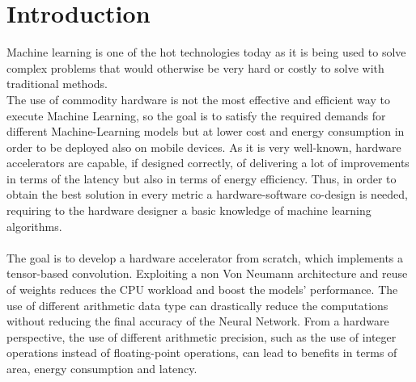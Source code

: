 \chapter{Introduction}
Machine learning is one of the hot technologies today as it is being used to solve complex problems that would otherwise be very hard or costly to solve with traditional methods.\\The use of commodity hardware is not the most effective and efficient way to execute Machine Learning, so the goal is to satisfy the required demands for different Machine-Learning models but at lower cost and energy consumption in order to be deployed also on mobile devices.
As it is very well-known, hardware accelerators are capable, if designed correctly, of delivering a lot of improvements in terms of the latency but also in terms of energy efficiency. Thus, in order to obtain the best solution in every metric a hardware-software co-design is needed, requiring to the hardware designer a basic knowledge of machine learning algorithms.\\\\
The goal is to develop a hardware accelerator from scratch, which implements a tensor-based convolution. Exploiting a non Von Neumann architecture and reuse of weights reduces the CPU workload and boost the models' performance. The use of different arithmetic data type can drastically reduce the computations without reducing the final accuracy of the Neural Network. From a hardware perspective, the use of different arithmetic precision, such as the use of integer operations instead of floating-point operations, can lead to benefits in terms of area, energy consumption and latency.
